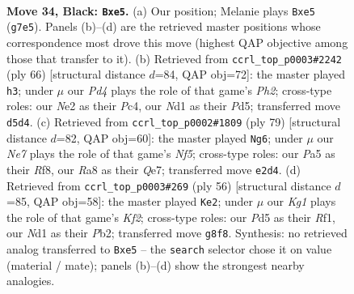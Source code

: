 \documentclass[11pt]{article}
\begin{document}
\clearpage

\begin{figure}[p]\centering
\begin{subfigure}{0.46\textwidth}\centering
\resizebox{\linewidth}{!}{%
\newchessgame
\chessboard[
  setfen={r5k1/1p3pb1/q5p1/p2pB3/7p/7P/P3nPP1/RN1nQ2K b - - 5 34},
  showmover=false,
  pgfstyle=straightmove, color=movearrow, markmove={g7-e5}
]}
\caption{}
\end{subfigure}\hfill
\begin{subfigure}{0.46\textwidth}\centering
\resizebox{\linewidth}{!}{%
\newchessgame
\chessboard[
  setfen={5r2/3b3k/3p2p1/1NqPpnp1/2P5/3B1P2/2Q3PP/1R5K w - - 3 34},
  showmover=false,
  pgfstyle=straightmove, color=movearrow, markmove={h2-h3}
]}
\caption{}
\end{subfigure}
\\[4pt]
\begin{subfigure}{0.46\textwidth}\centering
\resizebox{\linewidth}{!}{%
\newchessgame
\chessboard[
  setfen={5r2/4q2k/p6p/1pb2p2/3Npn2/2P1Q3/PPB2PP1/3R2K1 b - - 3 40},
  showmover=false,
  pgfstyle=straightmove, color=movearrow, markmove={f4-g6}
]}
\caption{}
\end{subfigure}\hfill
\begin{subfigure}{0.46\textwidth}\centering
\resizebox{\linewidth}{!}{%
\newchessgame
\chessboard[
  setfen={4k2r/pp2np2/2pb4/8/3PQNB1/6P1/PP3KPq/5R2 w - - 3 29},
  showmover=false,
  pgfstyle=straightmove, color=movearrow, markmove={f2-e2}
]}
\caption{}
\end{subfigure}
\caption{\textbf{Move 34, Black: \texttt{Bxe5}.} (a) Our position; Melanie plays \texttt{Bxe5} (\texttt{g7e5}). Panels (b)--(d) are the retrieved master positions whose correspondence most drove this move (highest QAP objective among those that transfer to it). (b) Retrieved from \texttt{ccrl\_top\_p0003\#2242} (ply 66) [structural distance $d$=84, QAP obj=72]: the master played \texttt{h3}; under $\mu$ our \emph{Pd4} plays the role of that game's \emph{Ph2}; cross-type roles: our \emph{N}e2 as their \emph{P}c4, our \emph{N}d1 as their \emph{P}d5; transferred move \texttt{d5d4}. (c) Retrieved from \texttt{ccrl\_top\_p0002\#1809} (ply 79) [structural distance $d$=82, QAP obj=60]: the master played \texttt{Ng6}; under $\mu$ our \emph{Ne7} plays the role of that game's \emph{Nf5}; cross-type roles: our \emph{P}a5 as their \emph{R}f8, our \emph{R}a8 as their \emph{Q}e7; transferred move \texttt{e2d4}. (d) Retrieved from \texttt{ccrl\_top\_p0003\#269} (ply 56) [structural distance $d$=85, QAP obj=58]: the master played \texttt{Ke2}; under $\mu$ our \emph{Kg1} plays the role of that game's \emph{Kf2}; cross-type roles: our \emph{P}d5 as their \emph{R}f1, our \emph{N}d1 as their \emph{P}b2; transferred move \texttt{g8f8}. Synthesis: no retrieved analog transferred to \texttt{Bxe5} -- the \texttt{search} selector chose it on value (material / mate); panels (b)--(d) show the strongest nearby analogies.}
\label{fig:thought-m67}
\end{figure}
\end{document}
